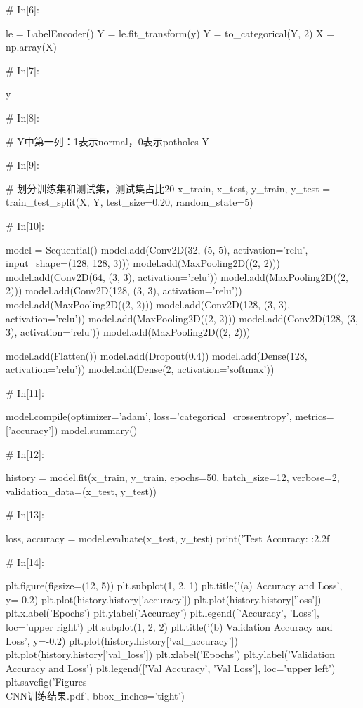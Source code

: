 \documentclass{MathorCupmodeling}
\begin{document}
\begin{python}
# In[6]:


le = LabelEncoder()
Y = le.fit_transform(y)
Y = to_categorical(Y, 2)
X = np.array(X)

# In[7]:


y

# In[8]:


# Y中第一列：1表示normal，0表示potholes
Y

# In[9]:


# 划分训练集和测试集，测试集占比20%
x_train, x_test, y_train, y_test = train_test_split(X, Y, test_size=0.20, random_state=5)

# In[10]:


model = Sequential()
model.add(Conv2D(32, (5, 5), activation='relu', input_shape=(128, 128, 3)))
model.add(MaxPooling2D((2, 2)))
model.add(Conv2D(64, (3, 3), activation='relu'))
model.add(MaxPooling2D((2, 2)))
model.add(Conv2D(128, (3, 3), activation='relu'))
model.add(MaxPooling2D((2, 2)))
model.add(Conv2D(128, (3, 3), activation='relu'))
model.add(MaxPooling2D((2, 2)))
model.add(Conv2D(128, (3, 3), activation='relu'))
model.add(MaxPooling2D((2, 2)))

model.add(Flatten())
model.add(Dropout(0.4))
model.add(Dense(128, activation='relu'))
model.add(Dense(2, activation='softmax'))

# In[11]:


model.compile(optimizer='adam', loss='categorical_crossentropy', metrics=['accuracy'])
model.summary()

# In[12]:


history = model.fit(x_train, y_train, epochs=50, batch_size=12, verbose=2, validation_data=(x_test, y_test))

# In[13]:


loss, accuracy = model.evaluate(x_test, y_test)
print('Test Accuracy: {:2.2f}%

# In[14]:


plt.figure(figsize=(12, 5))
plt.subplot(1, 2, 1)
plt.title('(a) Accuracy and Loss', y=-0.2)
plt.plot(history.history['accuracy'])
plt.plot(history.history['loss'])
plt.xlabel('Epochs')
plt.ylabel('Accuracy')
plt.legend(['Accuracy', 'Loss'], loc='upper right')
plt.subplot(1, 2, 2)
plt.title('(b) Validation Accuracy and Loss', y=-0.2)
plt.plot(history.history['val_accuracy'])
plt.plot(history.history['val_loss'])
plt.xlabel('Epochs')
plt.ylabel('Validation Accuracy and Loss')
plt.legend(['Val Accuracy', 'Val Loss'], loc='upper left')
plt.savefig('Figures\\CNN训练结果.pdf', bbox_inches='tight')


\end{python}
\end{document}
